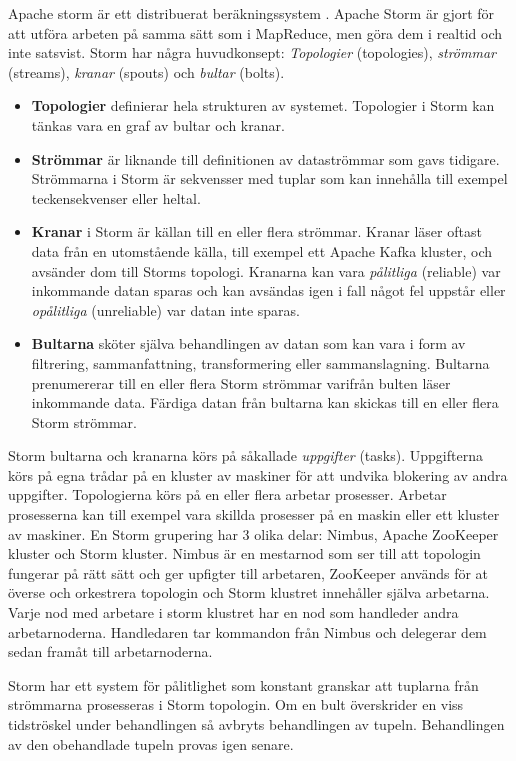 Apache storm är ett distribuerat beräkningssystem \citep{apachestorm}. Apache Storm är gjort för att utföra arbeten
på samma sätt som i MapReduce, men göra dem i realtid och inte satsvist. Storm har några huvudkonsept: \textit{Topologier} (topologies),
\textit{strömmar} (streams), \textit{kranar} (spouts) och \textit{bultar} (bolts).
\begin{itemize}
    \item \textbf{Topologier} definierar hela strukturen av systemet. Topologier i Storm kan tänkas vara en graf av bultar och kranar.
    \item \textbf{Strömmar} är liknande till definitionen av dataströmmar som gavs tidigare. Strömmarna i Storm är sekvensser med tuplar som kan innehålla till exempel teckensekvenser eller heltal.
    \item \textbf{Kranar} i Storm är källan till en
eller flera strömmar. Kranar läser oftast data från en utomstående källa, till exempel ett Apache Kafka kluster, och avsänder dom till Storms topologi. Kranarna kan vara 
\textit{pålitliga} (reliable) var inkommande datan sparas och kan avsändas igen i fall något fel uppstår eller \textit{opålitliga} (unreliable)
var datan inte sparas.
   \item \textbf{Bultarna} sköter själva behandlingen av datan som kan vara i form av filtrering, sammanfattning, transformering 
eller sammanslagning. Bultarna prenumererar till en eller flera Storm strömmar varifrån bulten läser inkommande data. Färdiga datan från
bultarna kan skickas till en eller flera Storm strömmar.
\end{itemize}

Storm bultarna och kranarna körs på såkallade \textit{uppgifter} (tasks). Uppgifterna körs på egna trådar på en kluster av maskiner 
för att undvika blokering av andra uppgifter. Topologierna körs på en eller flera arbetar prosesser. Arbetar prosesserna kan till exempel vara
skillda prosesser på en maskin eller ett kluster av maskiner. En Storm grupering har 3 olika delar\citep{marz2013big}: Nimbus, Apache ZooKeeper 
kluster och Storm kluster. Nimbus är en mestarnod som ser till att topologin fungerar på rätt sätt och ger upfigter till arbetaren, ZooKeeper
används för at överse och orkestrera topologin och Storm klustret innehåller själva arbetarna. Varje nod med arbetare i storm klustret har en nod
som handleder andra arbetarnoderna. Handledaren tar kommandon från Nimbus och delegerar dem sedan framåt till arbetarnoderna.

Storm har ett system för pålitlighet som konstant granskar att tuplarna från strömmarna prosesseras i Storm topologin. Om en bult överskrider en
viss tidströskel under behandlingen så avbryts behandlingen av tupeln. Behandlingen av den obehandlade tupeln provas igen senare. 

